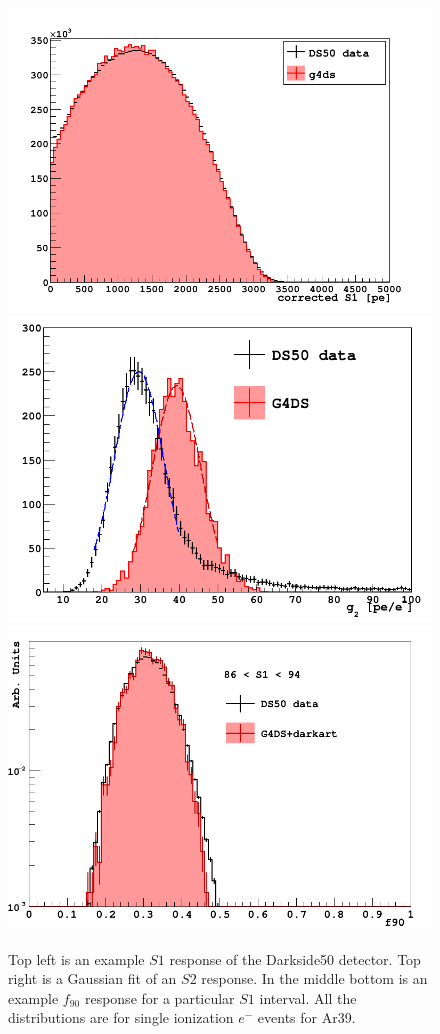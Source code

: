 \documentclass[11pt]{article} %
\begin{document}
\begin{figure}[H]
\centering
\includegraphics[scale=0.25]{images/s1_response.png}
\includegraphics[scale=0.25]{images/s2_response.png}
\includegraphics[scale=0.25]{images/f90_signal.png}
\caption{\cite{agnes:tel-01497505} Top left is an example $S1$ response of the Darkside50 detector. Top right is a Gaussian fit
of an $S2$ response. In the middle bottom is an example $f_{90}$ response for a particular $S1$ interval. All the distributions are for single ionization $e^-$ events for Ar39.}
\label{fig:variablesExamples}
\end{figure}
\end{document}
